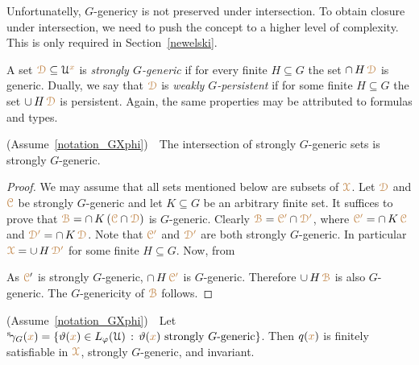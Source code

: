 Unfortunatelly, $G$-genericy is not preserved under intersection.
To obtain closure under intersection, we need to push the concept to a higher level of complexity.
This is only required in Section~\ref{newelski}.



A set ${\color{brown}\EuScript D}\subseteq\EuScript U^{\color{brown} x}$ is \emph{strongly $G$-generic\/} if for every finite $H\subseteq G$ the set $\cap\,H\,{\color{brown}\EuScript D}$ is generic.
Dually, we say that ${\color{brown}\EuScript D}$ is \emph{weakly $G$-persistent\/} if for some finite $H\subseteq G$ the set $\cup\,H\,{\color{brown}\EuScript D}$ is persistent.
Again, the same properties may be attributed to formulas and types.

\begin{lemma}\label{lem_strongly_generic}
  (Assume~\ref{notation_GXphi})\ \  
  The intersection of strongly $G$-generic sets is strongly $G$-generic.
\end{lemma}

\begin{proof}
  We may assume that all sets mentioned below are subsets of ${\color{brown}\EuScript X}$.
  Let ${\color{brown}\EuScript D}$ and ${\color{brown}\EuScript C}$ be strongly $G$-generic and let $K\subseteq G$ be an arbitrary finite set.
  It suffices to prove that ${\color{brown}\EuScript B}=\cap\, K\,({\color{brown}\EuScript C}\cap{\color{brown}\EuScript D})$ is $G$-generic. 
  Clearly ${\color{brown}\EuScript B}={\color{brown}\EuScript C'}\cap{\color{brown}\EuScript D'}$, where ${\color{brown}\EuScript C'}=\cap\, K\,{\color{brown}\EuScript C}$ and ${\color{brown}\EuScript D'}=\cap\, K\,{\color{brown}\EuScript D}$.
  Note that ${\color{brown}\EuScript C'}$ and ${\color{brown}\EuScript D'}$ are both strongly $G$-generic.
  In particular ${\color{brown}\EuScript X}=\cup\,H\,\color{brown}\EuScript D'$ for some finite $H\subseteq G$.
  Now, from
  

  
  
  
  As ${{\color{brown}\EuScript C}'}$ is strongly $G$-generic, $\cap\, H\,{\color{brown}\EuScript C'}$ is $G$-generic.
  Therefore $\cup\,H\,{\color{brown}\EuScript B}$ is also $G$-generic.
  The $G$-genericity of ${\color{brown}\EuScript B}$ follows.
\end{proof}

\begin{corollary}\label{corol_str_gen}
  (Assume~\ref{notation_GXphi})\ \  
  Let ${}^{\rm s}\kern-.3ex\gamma_G({\color{brown} x})=\{\vartheta({\color{brown} x})\in L_\varphi(\EuScript U)\,:\, \vartheta({\color{brown} x})\textrm{ strongly $G$-generic}\}$.
  Then $q({\color{brown} x})$ is finitely satisfiable in ${\color{brown}\EuScript X}$, strongly $G$-generic, and invariant.
\end{corollary}

